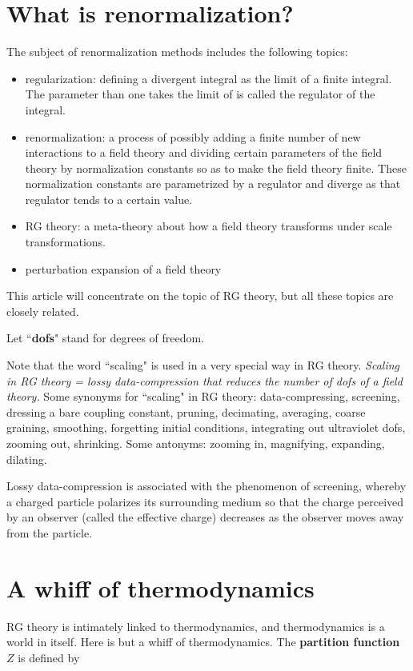 \documentclass[12pt]{article}
\begin{document}
\section{What is renormalization?}

The subject of renormalization
methods includes the following topics:
\begin{itemize}
\item regularization:
defining a divergent integral as the
limit of a finite integral.
The parameter than one takes
the limit of is called the
regulator of the integral.
\item renormalization:
a process of possibly
adding a finite number
of new interactions to a field theory
and dividing certain parameters
of the field theory
by normalization constants
so as to make the
field theory finite. These
normalization constants
are parametrized by a
regulator and diverge as
that regulator tends to a
certain value.
\item RG theory: a meta-theory
about how a field theory transforms
under scale transformations.
\item perturbation expansion of a field
theory
\end{itemize}
This article will concentrate
on the topic of RG theory,
but all these topics are closely
related.

Let ``{\bf dofs}" stand for
degrees of freedom.

Note that the word
``scaling" is used in a very
special way
in RG theory.
\emph{Scaling in RG theory =
lossy data-compression
that
reduces the number of dofs of a field theory.}
Some synonyms for ``scaling"
in RG theory:
data-compressing,
screening,
dressing a bare coupling constant,
pruning,
decimating,
averaging,
coarse graining,
smoothing,
forgetting initial conditions,
integrating out ultraviolet dofs,
zooming out,
shrinking. Some antonyms:
zooming in,
magnifying,
expanding,
dilating.

Lossy data-compression
is associated with
 the phenomenon of screening,
whereby a charged particle polarizes
its surrounding medium so that
the charge perceived by
an observer (called
the effective charge)
decreases as
the observer moves
away from the particle.


\section{A whiff of thermodynamics}
RG theory is intimately linked to
thermodynamics,
and thermodynamics is a world in itself.
Here is but a whiff of thermodynamics.
The \textbf{partition function} $Z$ is defined by
\end{document}
